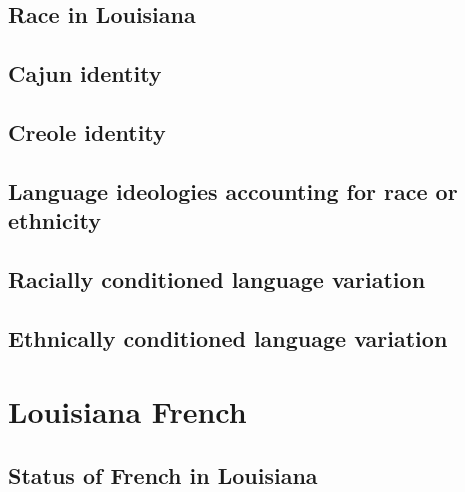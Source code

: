     \subsection{Race in Louisiana}
    \subsection{Cajun identity}
    \subsection{Creole identity}
    \subsection{Language ideologies accounting for race or ethnicity}
    \subsection{Racially conditioned language variation}
    \subsection{Ethnically conditioned language variation}
  \section{Louisiana French}
    \subsection{Status of French in Louisiana}

